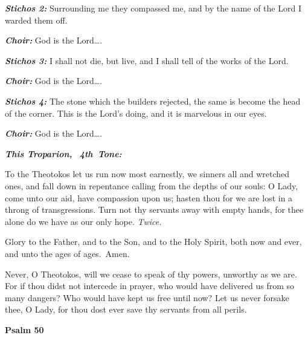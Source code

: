 \textbf{\emph{Stichos 2:}}
 Surrounding me they compassed me, and by the name of the Lord I warded them off.

\textbf{\emph{Choir:}}
 God is the Lord\ldots.

\textbf{\emph{Stichos 3:}}
 I shall not die, but live, and I shall tell of the works of the Lord.

\textbf{\emph{Choir:}}
 God is the Lord\ldots.

\textbf{\emph{Stichos 4:}}
 The stone which the builders rejected, the same is become the head of the corner.
 This is the Lord's doing, and it is marvelous in our eyes.

\textbf{\emph{Choir:}}
 God is the Lord\ldots.

\emph{\textbf{This Troparion,}
~\textbf{4th~Tone:}}

To the Theotokos let us run now most earnestly, we sinners all and wretched ones, and fall down in repentance calling from the depths of our souls:
 O Lady, come unto our aid, have compassion upon us; 
hasten thou for we are lost in a throng of transgressions.
 Turn not thy servants away with empty hands, for thee alone do we have as our only hope.
 \emph{Twice.}

Glory to the Father, and to the Son, and to the Holy Spirit, both now and ever, and unto the ages of ages.~Amen.

Never, O Theotokos, will we cease to speak of thy powers, unworthy as we are.
 For if thou didst not intercede in prayer, who would have delivered us from so many dangers? Who would have kept us free until now?
 Let us never forsake thee, O Lady, for thou dost ever save thy servants from all perils.

\textbf{Psalm 50}

